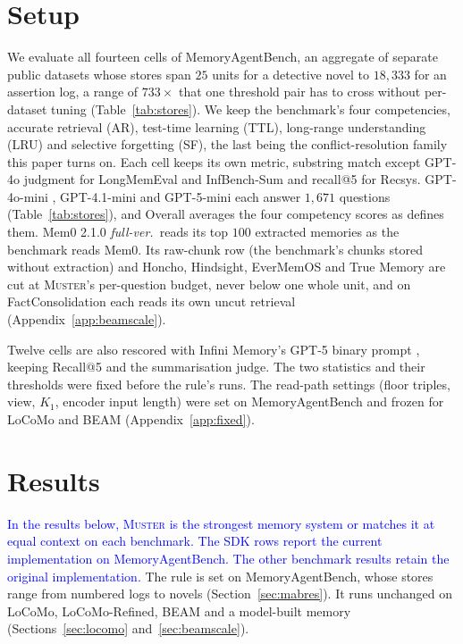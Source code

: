 \documentclass{article}
\newcommand{\nativechange}[1]{\textcolor{blue}{#1}}
\newcommand{\sys}{\textsc{Muster}}
\begin{document}
\section{Setup}\label{sec:setup}

We evaluate all fourteen cells of MemoryAgentBench, an aggregate of separate public datasets whose stores span $25$ units for a detective novel to $18{,}333$ for an assertion log, a range of $733\times$ that one threshold pair has to cross without per-dataset tuning (Table~\ref{tab:stores}). We keep the benchmark's four competencies, accurate retrieval (AR), test-time learning (TTL), long-range understanding (LRU) and selective forgetting (SF), the last being the conflict-resolution family this paper turns on. Each cell keeps its own metric, substring match except GPT-4o judgment for LongMemEval and InfBench-Sum and recall@5 for Recsys. GPT-4o-mini \cite{gpt4omini}, GPT-4.1-mini \cite{gpt41} and GPT-5-mini \cite{gpt5} each answer $1{,}671$ questions (Table~\ref{tab:stores}), and Overall averages the four competency scores as \cite{mab} defines them. Mem0 2.1.0 \emph{full-ver.}\ reads its top $100$ extracted memories as the benchmark reads Mem0. Its raw-chunk row (the benchmark's chunks stored without extraction) and Honcho, Hindsight, EverMemOS and True Memory are cut at \sys{}'s per-question budget, never below one whole unit, and on FactConsolidation each reads its own uncut retrieval (Appendix~\ref{app:beamscale}).

Twelve cells are also rescored with Infini Memory's GPT-5 binary prompt \cite{infini}, keeping Recall@5 and the summarisation judge.
The two statistics and their thresholds were fixed before the rule's runs. The read-path settings (floor
triples, view, $K_1$, encoder input length) were set on MemoryAgentBench and frozen for LoCoMo and BEAM (Appendix~\ref{app:fixed}).

\section{Results}\label{sec:results}

\nativechange{In the results below, \sys{} is the strongest memory system or matches it at equal context on each benchmark. The SDK rows report the current implementation on MemoryAgentBench. The other benchmark results retain the original implementation.} The rule is set on MemoryAgentBench, whose stores range from numbered logs to novels (Section~\ref{sec:mabres}). It runs unchanged on LoCoMo, LoCoMo-Refined, BEAM and a model-built memory (Sections~\ref{sec:locomo} and~\ref{sec:beamscale}).
\end{document}
